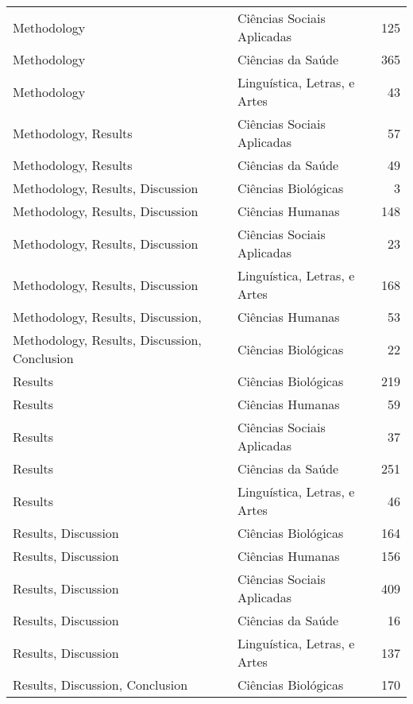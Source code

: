 \begin{longtable}{llr}
Methodology & Ciências Sociais Aplicadas & 125 \\
Methodology & Ciências da Saúde & 365 \\
Methodology & Linguística, Letras, e Artes & 43 \\
Methodology, Results & Ciências Sociais Aplicadas & 57 \\
Methodology, Results & Ciências da Saúde & 49 \\
Methodology, Results, Discussion & Ciências Biológicas & 3 \\
Methodology, Results, Discussion & Ciências Humanas & 148 \\
Methodology, Results, Discussion & Ciências Sociais Aplicadas & 23 \\
Methodology, Results, Discussion & Linguística, Letras, e Artes & 168 \\
Methodology, Results, Discussion, & Ciências Humanas & 53 \\
Methodology, Results, Discussion, Conclusion & Ciências Biológicas & 22 \\
Results & Ciências Biológicas & 219 \\
Results & Ciências Humanas & 59 \\
Results & Ciências Sociais Aplicadas & 37 \\
Results & Ciências da Saúde & 251 \\
Results & Linguística, Letras, e Artes & 46 \\
Results, Discussion & Ciências Biológicas & 164 \\
Results, Discussion & Ciências Humanas & 156 \\
Results, Discussion & Ciências Sociais Aplicadas & 409 \\
Results, Discussion & Ciências da Saúde & 16 \\
Results, Discussion & Linguística, Letras, e Artes & 137 \\
Results, Discussion, Conclusion & Ciências Biológicas & 170 \\
\end{longtable}

